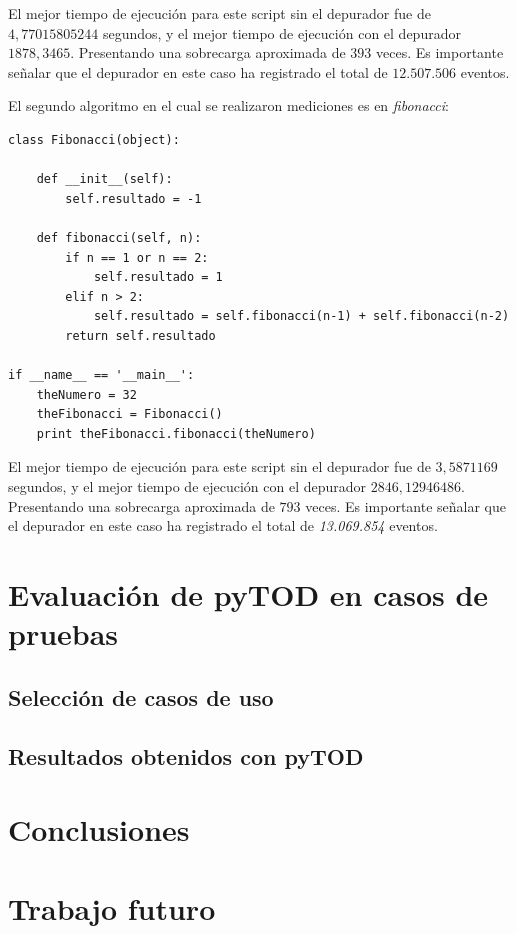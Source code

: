 \documentclass[12pt,legalpaper]{report}
\begin{document}
El mejor tiempo de ejecución para este script sin el depurador fue de $4,77015805244$ segundos, y el mejor tiempo de ejecución con el depurador $1878,3465$.  Presentando una sobrecarga aproximada de $393$ veces. Es importante señalar que el depurador en este caso ha registrado el total de $12.507.506$ eventos.

El segundo algoritmo en el cual se realizaron mediciones es en \textit{fibonacci}:

\begin{singlespace}
\begin{lstlisting}[style=Python]
class Fibonacci(object):
    
    def __init__(self):
        self.resultado = -1
        
    def fibonacci(self, n):
        if n == 1 or n == 2:
            self.resultado = 1
        elif n > 2:
            self.resultado = self.fibonacci(n-1) + self.fibonacci(n-2)
        return self.resultado

if __name__ == '__main__':
    theNumero = 32
    theFibonacci = Fibonacci()
    print theFibonacci.fibonacci(theNumero)
\end{lstlisting}
\end{singlespace}	

El mejor tiempo de ejecución para este script sin el depurador fue de $3,5871169$ segundos, y el mejor tiempo de ejecución con el depurador $2846,12946486$.  Presentando una sobrecarga aproximada de $793$ veces.  Es importante señalar que el depurador en este caso ha registrado el total de \textit{13.069.854} eventos.
	
\chapter{Evaluación de pyTOD en casos de pruebas}
	\section{Selección de casos de uso}
	\section{Resultados obtenidos con pyTOD}
\chapter{Conclusiones}
\chapter{Trabajo futuro}
\newpage
\end{document}
